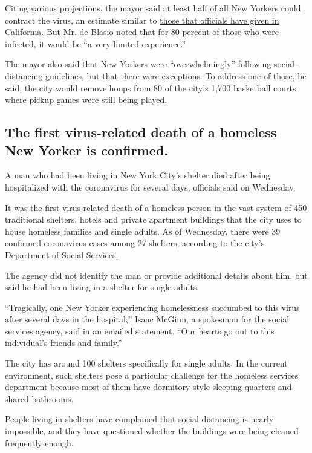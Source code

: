 Citing various projections, the mayor said at least half of all New
Yorkers could contract the virus, an estimate similar to
\href{https://www.nytimes3xbfgragh.onion/2020/03/19/us/California-stay-at-home-order-virus.html}{those
that officials have given in California}. But Mr. de Blasio noted that
for 80 percent of those who were infected, it would be ``a very limited
experience.''

The mayor also said that New Yorkers were ``overwhelmingly'' following
social-distancing guidelines, but that there were exceptions. To address
one of those, he said, the city would remove hoops from 80 of the city's
1,700 basketball courts where pickup games were still being played.

\hypertarget{the-first-virus-related-death-of-a-homeless-new-yorker-is-confirmed}{%
\subsection{The first virus-related death of a homeless New Yorker is
confirmed.}\label{the-first-virus-related-death-of-a-homeless-new-yorker-is-confirmed}}

A man who had been living in New York City's shelter died after being
hospitalized with the coronavirus for several days, officials said on
Wednesday.

It was the first virus-related death of a homeless person in the vast
system of 450 traditional shelters, hotels and private apartment
buildings that the city uses to house homeless families and single
adults. As of Wednesday, there were 39 confirmed coronavirus cases among
27 shelters, according to the city's Department of Social Services.

The agency did not identify the man or provide additional details about
him, but said he had been living in a shelter for single adults.

``Tragically, one New Yorker experiencing homelessness succumbed to this
virus after several days in the hospital,'' Isaac McGinn, a spokesman
for the social services agency, said in an emailed statement. ``Our
hearts go out to this individual's friends and family.''

The city has around 100 shelters specifically for single adults. In the
current environment, such shelters pose a particular challenge for the
homeless services department because most of them have dormitory-style
sleeping quarters and shared bathrooms.

People living in shelters have complained that social distancing is
nearly impossible, and they have questioned whether the buildings were
being cleaned frequently enough.

